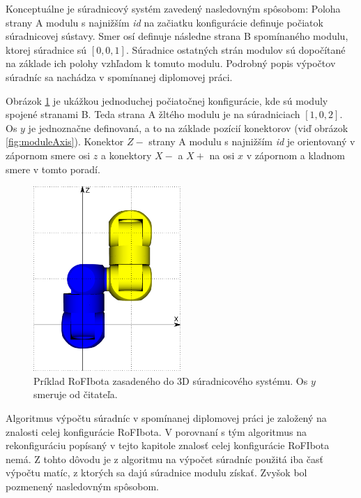 \documentclass[
  digital, %
  oneside, %
  notable,   %
  lof,     %
  nolot,     %
]{fithesis3}
\begin{document}
Konceptuálne je súradnicový systém zavedený nasledovným spôsobom: Poloha strany A modulu s najnižším \textit{id} na začiatku konfigurácie definuje počiatok súradnicovej sústavy. Smer osí definuje následne strana B spomínaného modulu, ktorej súradnice sú $[0, 0, 1]$. Súradnice ostatných strán modulov sú dopočítané na základe ich polohy vzhľadom k tomuto modulu. Podrobný popis výpočtov súradníc sa nachádza v spomínanej diplomovej práci.  

Obrázok \ref{fig:moduleCoordinates} je ukážkou jednoduchej počiatočnej konfigurácie, kde sú moduly spojené stranami B. Teda strana A žltého modulu je na súradniciach $[1, 0, 2]$. Os $y$ je jednoznačne definovaná, a to na základe pozícií konektorov (viď obrázok \ref{fig:moduleAxis}). Konektor $Z-$ strany A modulu s najnižším \textit{id} je orientovaný v zápornom smere osi $z$ a konektory $X-$ a $X+$ na osi $x$ v zápornom a kladnom smere v tomto poradí. 

\begin{figure}[hbt!]
    \centering
    \includegraphics[width=0.5\textwidth]{pictures/module_coordinates.pdf}
    \caption[Ukážka súradnicového systému]{Príklad RoFIbota zasadeného do 3D súradnicového systému. Os $y$ smeruje od čitateľa. }
    \label{fig:moduleCoordinates}
\end{figure}

Algoritmus výpočtu súradníc v spomínanej diplomovej práci je založený na znalosti celej konfigurácie RoFIbota. V porovnaní s tým algoritmus na rekonfiguráciu popísaný v tejto kapitole znalosť celej konfigurácie RoFIbota nemá. Z tohto dôvodu je z algoritmu na výpočet súradníc použitá iba časť výpočtu matíc, z ktorých sa dajú súradnice modulu získať. Zvyšok bol pozmenený nasledovným spôsobom. 
\end{document}
